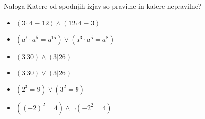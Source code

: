         \begin{frame}
            \begin{exampleblock}{Naloga}
                Katere od spodnjih izjav so pravilne in katere nepravilne?
                \begin{itemize}
                    \item $(3\cdot 4 = 12)\land(12:4=3)$
                    \item $(a^3\cdot a^5=a^15)\lor (a^3\cdot a^5=a^8)$
                    \item $(3|30)\land(3|26)$
                    \item $(3|30)\lor(3|26)$
                    \item $(2^3=9)\lor(3^2=9)$
                    \item $((-2)^2=4)\land\lnot(-2^2=4)$
                \end{itemize}
            \end{exampleblock}
        \end{frame}

